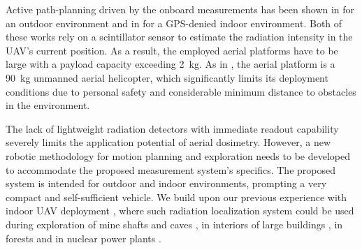 \documentclass[a4paper,11pt,titlepage,twoside]{book}
\begin{document}
Active path-planning driven by the onboard measurements has been shown in \cite{towler2012radiation} for an outdoor environment and in \cite{mascarich2018radiation} for a GPS-denied indoor environment.
Both of these works rely on a scintillator sensor to estimate the radiation intensity in the \ac{UAV}'s current position.
As a result, the employed aerial platforms have to be large with a payload capacity exceeding \SI{2}{\kilogram}.
As in \cite{towler2012radiation}, the aerial platform is a \SI{90}{\kilogram} unmanned aerial helicopter, which significantly limits its deployment conditions due to personal safety and considerable minimum distance to obstacles in the environment.

The lack of lightweight radiation detectors with immediate readout capability severely limits the application potential of aerial dosimetry.
However, a new robotic methodology for motion planning and exploration needs to be developed to accommodate the proposed measurement system's specifics.
The proposed system is intended for outdoor and indoor environments, prompting a very compact and self-sufficient vehicle.
We build upon our previous experience with indoor \ac{UAV} deployment \cite{baca2020mrs}, where such radiation localization system could be used during exploration of mine shafts and caves \cite{roucek2019darpa, petrlik2020robust}, in interiors of large buildings \cite{kratky2020autonomous, saska2020formation}, in forests \cite{petracek2020bioinspired} and in nuclear power plants \cite{kratky2020autonomous2}.


\end{document}
